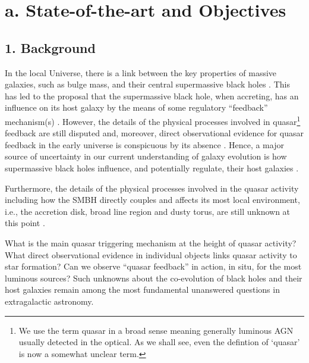 
\section*{a. State-of-the-art and Objectives}

\subsection*{1. Background}

\smallskip
\smallskip
\noindent
In the local Universe, there is a link between the key properties of
massive galaxies, such as bulge mass, %
and their central supermassive black holes
\citep[SMBHs; e.g., ][]{McLure_Dunlop2002, HaringRix2004, Salviander2007, Greene2010, 
KormendyHo2013}. This has led to the proposal that the
supermassive black hole, when accreting, has an influence on its host
galaxy by the means of some regulatory ``feedback'' mechanism(s)
\citep[e.g., ][]{AlexanderHickox2012, Fabian2012,
KingPounds2015}. However, the details of the physical processes
involved in quasar\footnote{We use the term quasar in a broad sense
meaning generally luminous AGN usually detected in the optical. As we
shall see, even the defintion of `quasar' is now a somewhat unclear
term.} feedback are still disputed and, moreover, direct observational
evidence for quasar feedback in the early universe is conspicuous by
its absence \citep[e.g., ][]{HeckmanBest2014,
NaabOstriker2017}. Hence, a major source of uncertainty in our current
understanding of galaxy evolution is how supermassive black holes
influence, and potentially regulate, their host galaxies
\citep{Vogelsberger2013, Vogelsberger2014, Schaye2015,
Angles-Alcazar2013, Angles-Alcazar2017}.

\smallskip 
\smallskip
\noindent
Furthermore, the details of the physical processes involved in the quasar
activity including how the SMBH directly couples and affects its most
local environment, i.e., the accretion disk, broad line region and
dusty torus, are still unknown at this point 
\citep[e.g.,][]{Netzer2015, Padovani2017}. 

\smallskip
\smallskip
\noindent
What is the main quasar triggering mechanism at the height of quasar
activity? What direct observational evidence in individual objects
links quasar activity to star formation?  Can we observe ``quasar feedback''
in action, in situ, for the most luminous sources?  Such unknowns
about the co-evolution of black holes and their host galaxies remain
among the most fundamental unanswered questions in extragalactic
astronomy.  

